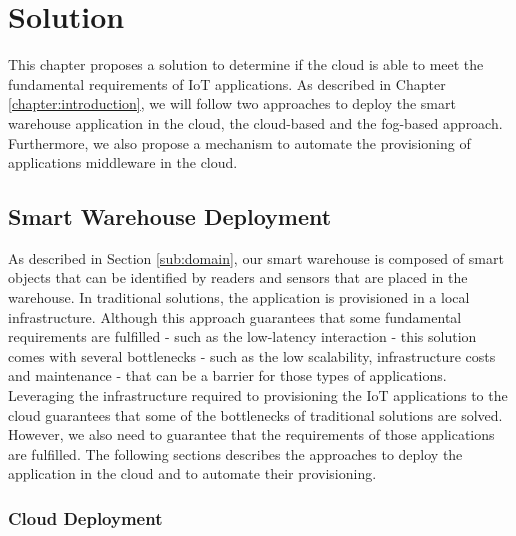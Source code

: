 
\chapter{Solution}
\label{chapter:solution}
This chapter proposes a solution to determine if the cloud is able to meet the fundamental requirements
of \gls{IoT} applications. As described in Chapter \ref{chapter:introduction}, we will follow two
approaches to deploy the smart warehouse application in the cloud, the cloud-based and the fog-based
approach. Furthermore, we also propose a mechanism to automate the provisioning of applications
middleware in the cloud.

\section{Smart Warehouse Deployment}
\label{sec:smart_warehouse_deployment}
As described in Section \ref{sub:domain}, our smart warehouse is composed of smart objects that
can be identified by readers and sensors that are placed in the warehouse. In traditional solutions,
the application is provisioned in a local infrastructure. Although this approach guarantees that
some fundamental requirements are fulfilled - such as the low-latency interaction - this solution
comes with several bottlenecks - such as the low scalability, infrastructure costs and maintenance -
that can be a barrier for those types of applications.\\

Leveraging the infrastructure required to provisioning the \gls{IoT} applications to the cloud
guarantees that some of the bottlenecks of traditional solutions are solved. However, we also need
to guarantee that the requirements of those applications are fulfilled. The following sections
describes the approaches to deploy the application in the cloud and to automate their
provisioning.

\subsection{Cloud Deployment}
\label{sub:sol_cloud}

